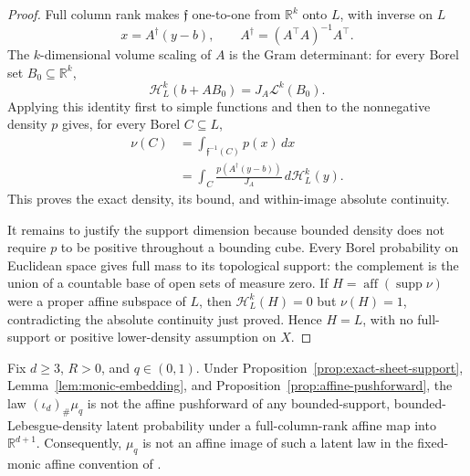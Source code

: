 \begin{proof}
Full column rank makes $\mathfrak f$ one-to-one from $\mathbb R^k$ onto
$L$, with inverse on $L$
\[
x=A^\dagger(y-b),
\qquad
A^\dagger=(A^\top A)^{-1}A^\top.
\]
The $k$-dimensional volume scaling of $A$ is the Gram determinant:
for every Borel set $B_0\subseteq\mathbb R^k$,
\[
\mathcal H_L^k(b+AB_0)=J_A\mathcal L^k(B_0).
\]
Applying this identity first to simple functions and then to the
nonnegative density $p$ gives, for every Borel $C\subseteq L$,
\[
\begin{aligned}
\nu(C)
&=\int_{\mathfrak f^{-1}(C)}p(x)\,dx\\
&=\int_C
\frac{p(A^\dagger(y-b))}{J_A}\,d\mathcal H_L^k(y).
\end{aligned}
\]
This proves the exact density, its bound, and within-image absolute
continuity.

It remains to justify the support dimension because bounded density does
not require $p$ to be positive throughout a bounding cube.  Every Borel
probability on Euclidean space gives full mass to its topological support:
the complement is the union of a countable base of open sets of measure
zero.  If
$H=\operatorname{aff}(\operatorname{supp}\nu)$ were a proper affine
subspace of $L$, then $\mathcal H_L^k(H)=0$ but $\nu(H)=1$, contradicting
the absolute continuity just proved.  Hence $H=L$, with no full-support or
positive lower-density assumption on $X$.
\end{proof}

\begin{proposition}
\label{prop:affine-nonmembership}
Fix $d\geq3$, $R>0$, and $q\in(0,1)$.  Under
Proposition~\ref{prop:exact-sheet-support},
Lemma~\ref{lem:monic-embedding}, and
Proposition~\ref{prop:affine-pushforward}, the law
$(\iota_d)_\#\mu_q$ is not the affine pushforward of any bounded-support,
bounded-Lebesgue-density latent probability under a full-column-rank
affine map into $\mathbb R^{d+1}$.  Consequently, $\mu_q$ is not an
affine image of such a latent law in the fixed-monic affine convention of
\citet{balcan2020semibandit}.
\end{proposition}

